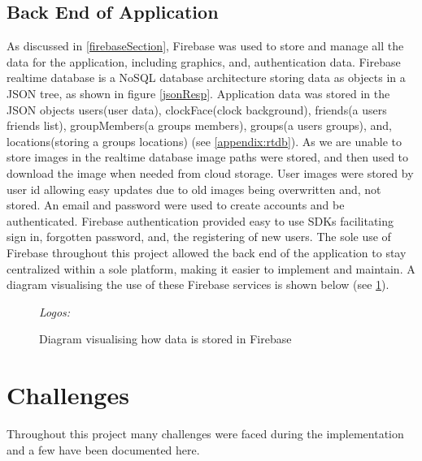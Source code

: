 \subsection{Back End of Application}
As discussed in \ref{firebaseSection}, Firebase was used to store and manage all the data for the application, including graphics, and, authentication data. Firebase realtime database is a NoSQL database architecture storing data as objects in a JSON tree, as shown in figure \ref{jsonResp}. Application data was stored in the JSON objects users(user data), clockFace(clock background), friends(a users friends list), groupMembers(a groups members), groups(a users groups), and, locations(storing a groups locations) (see \ref{appendix:rtdb}). As we are unable to store images in the realtime database image paths were stored, and then used to download the image when needed from cloud storage. User images were stored by user id allowing easy updates due to old images being overwritten and, not stored. An email and password were used to create accounts and be authenticated. Firebase authentication provided easy to use SDKs facilitating sign in, forgotten password, and, the registering of new users. The sole use of Firebase throughout this project allowed the back end of the application to stay centralized within a sole platform, making it easier to implement and maintain. A diagram visualising the use of these Firebase services is shown below (see \ref{fig:firebaseDiag}).
\begin{figure}[!htbp]
    \centering
    \begin{subfigure}[b]{\textwidth}
    \end{subfigure}
    \caption{Diagram visualising how data is stored in Firebase} \small\textit{{Logos: \cite{storImg, rtdbImg, authImg}}}
    \label{fig:firebaseDiag}
\end{figure}
\FloatBarrier
\section{Challenges}
Throughout this project many challenges were faced during the implementation and a few have been documented here.
